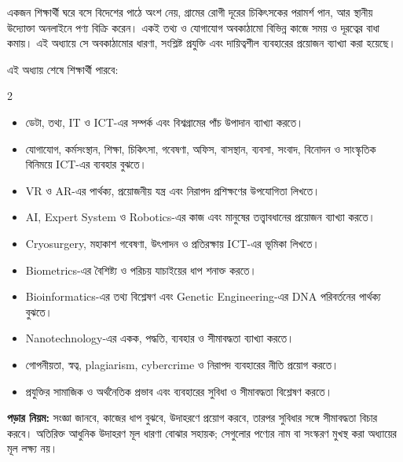 একজন শিক্ষার্থী ঘরে বসে বিদেশের পাঠে অংশ নেয়, গ্রামের রোগী দূরের চিকিৎসকের পরামর্শ পান, আর স্থানীয় উদ্যোক্তা অনলাইনে পণ্য বিক্রি করেন। একই তথ্য ও যোগাযোগ অবকাঠামো বিভিন্ন কাজে সময় ও দূরত্বের বাধা কমায়। এই অধ্যায়ে সে অবকাঠামোর ধারণা, সংশ্লিষ্ট প্রযুক্তি এবং দায়িত্বশীল ব্যবহারের প্রয়োজন ব্যাখ্যা করা হয়েছে।
\begin{learningbox}
এই অধ্যায় শেষে শিক্ষার্থী পারবে:
\begin{multicols}{2}
\begin{itemize}
\item ডেটা, তথ্য, IT ও ICT-এর সম্পর্ক এবং বিশ্বগ্রামের পাঁচ উপাদান ব্যাখ্যা করতে।
\item যোগাযোগ, কর্মসংস্থান, শিক্ষা, চিকিৎসা, গবেষণা, অফিস, বাসস্থান, ব্যবসা, সংবাদ, বিনোদন ও সাংস্কৃতিক বিনিময়ে ICT-এর ব্যবহার বুঝতে।
\item VR ও AR-এর পার্থক্য, প্রয়োজনীয় যন্ত্র এবং নিরাপদ প্রশিক্ষণের উপযোগিতা লিখতে।
\item AI, Expert System ও Robotics-এর কাজ এবং মানুষের তত্ত্বাবধানের প্রয়োজন ব্যাখ্যা করতে।
\item Cryosurgery, মহাকাশ গবেষণা, উৎপাদন ও প্রতিরক্ষায় ICT-এর ভূমিকা লিখতে।
\item Biometrics-এর বৈশিষ্ট্য ও পরিচয় যাচাইয়ের ধাপ শনাক্ত করতে।
\item Bioinformatics-এর তথ্য বিশ্লেষণ এবং Genetic Engineering-এর DNA পরিবর্তনের পার্থক্য বুঝতে।
\item Nanotechnology-এর একক, পদ্ধতি, ব্যবহার ও সীমাবদ্ধতা ব্যাখ্যা করতে।
\item গোপনীয়তা, স্বত্ব, plagiarism, cybercrime ও নিরাপদ ব্যবহারের নীতি প্রয়োগ করতে।
\item প্রযুক্তির সামাজিক ও অর্থনৈতিক প্রভাব এবং ব্যবহারের সুবিধা ও সীমাবদ্ধতা বিশ্লেষণ করতে।
\end{itemize}
\end{multicols}
\end{learningbox}
\textbf{পড়ার নিয়ম:} সংজ্ঞা জানবে, কাজের ধাপ বুঝবে, উদাহরণে প্রয়োগ করবে, তারপর সুবিধার সঙ্গে সীমাবদ্ধতা বিচার করবে। অতিরিক্ত আধুনিক উদাহরণ মূল ধারণা বোঝার সহায়ক; সেগুলোর পণ্যের নাম বা সংস্করণ মুখস্থ করা অধ্যায়ের মূল লক্ষ্য নয়।
